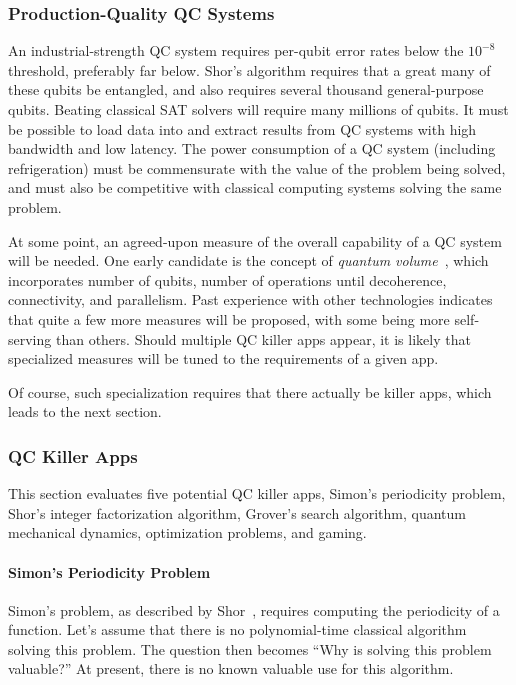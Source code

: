 \subsubsection{Production-Quality QC Systems}
\label{sec:future:Production-Quality QC Systems}

An industrial-strength QC system requires per-qubit error rates below the
$10^{-8}$ threshold, preferably far below.
Shor's algorithm requires that a great many of these qubits be entangled,
and also requires several thousand general-purpose qubits.
Beating classical SAT solvers will require many millions of qubits.
It must be possible to load data into and extract results from QC
systems with high bandwidth and low latency.
The power consumption of a QC system (including refrigeration) must be
commensurate with the value of the problem being solved, and must also
be competitive with classical computing systems solving the same problem.

At some point, an agreed-upon measure of the overall capability of a
QC system will be needed.
One early candidate is the concept of
\emph{quantum volume}~\cite{LevSBishop2017QuantumVolume}, which
incorporates number of qubits, number of operations until decoherence,
connectivity, and parallelism.
Past experience with other technologies indicates that quite a few more
measures will be proposed, with some being more self-serving than others.
Should multiple QC killer apps appear, it is likely that specialized
measures will be tuned to the requirements of a given app.

Of course, such specialization requires that there actually be killer
apps, which leads to the next section.

\subsubsection{QC Killer Apps}
\label{sec:future:QC Killer Apps}

This section evaluates five potential QC killer apps,
Simon's periodicity problem,
Shor's integer factorization algorithm,
Grover's search algorithm,
quantum mechanical dynamics,
optimization problems, and
gaming.

\paragraph{Simon's Periodicity Problem}
\label{sec:future:Simon's Periodicity Problem}

Simon's problem, as described by
Shor~\cite{PeterWSchor2001QuantumAlgorithms},
requires computing the periodicity of a function.
Let's assume that there is no polynomial-time classical
algorithm solving this problem.
The question then becomes ``Why is solving this problem valuable?''
At present, there is no known valuable use for this algorithm.

